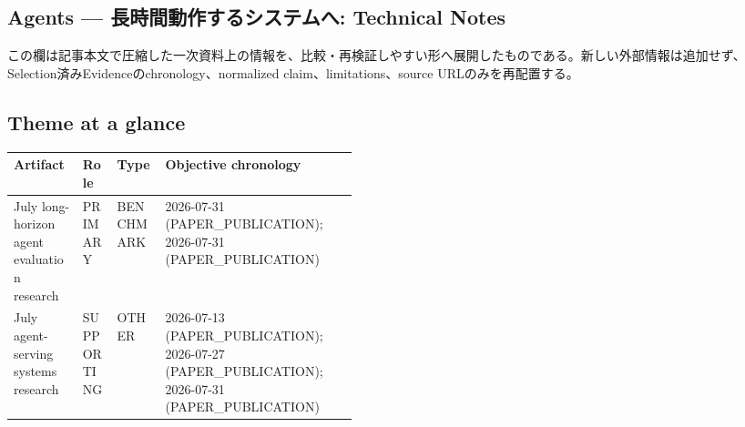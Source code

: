 \clearpage
{}
\subsection*{Agents — 長時間動作するシステムへ: Technical Notes}
この欄は記事本文で圧縮した一次資料上の情報を、比較・再検証しやすい形へ展開したものである。新しい外部情報は追加せず、Selection済みEvidenceのchronology、normalized claim、limitations、source URLのみを再配置する。
\medskip
\subsection*{Theme at a glance}
\begin{center}
\footnotesize
\begin{tabularx}{\linewidth}{@{}p{0.20\linewidth}p{0.10\linewidth}p{0.14\linewidth}X@{}}
\toprule
Artifact & Role & Type & Objective chronology \\
\midrule
July long-horizon agent evaluation research & PRIMARY & BENCHMARK & 2026-07-31 (PAPER\_PUBLICATION); 2026-07-31 (PAPER\_PUBLICATION) \\
July agent-serving systems research & SUPPORTING & OTHER & 2026-07-13 (PAPER\_PUBLICATION); 2026-07-27 (PAPER\_PUBLICATION); 2026-07-31 (PAPER\_PUBLICATION) \\
\bottomrule
\end{tabularx}
\end{center}
\normalsize

